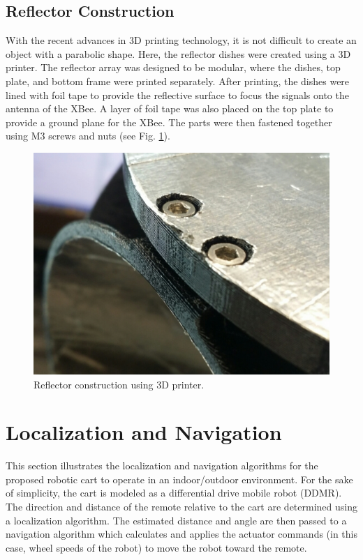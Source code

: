 \documentclass[conference]{IEEEtran}
\begin{document}
\subsection{Reflector Construction}
With the recent advances in 3D printing technology, it is not difficult to
create an object with a parabolic shape. Here, the reflector dishes
were created using a 3D printer. The reflector array was designed to be modular,
where the dishes, top plate, and bottom frame were printed separately. After
printing, the dishes were lined with foil tape to provide the reflective surface
to focus the signals onto the antenna of the XBee. A layer of foil tape was also
placed on the top plate to provide a ground plane for the XBee. The parts were
then fastened together using M3 screws and nuts (see Fig.
\ref{fig:reflectorConstruction}).
%
\begin{figure}[htbp]
    \centering
    \includegraphics[scale=0.1]{figs/img/reflectorConstruction.jpg}
    \caption{Reflector construction using 3D printer.}
    \label{fig:reflectorConstruction}
\end{figure}
%


\section{Localization and Navigation}
\label{sec:locAndNavAlgos}

This section illustrates the localization and navigation algorithms for the
proposed robotic cart to operate in an indoor/outdoor environment. For the sake
of simplicity, the cart is modeled as a differential drive mobile robot (DDMR).
The direction and distance of the remote relative to the cart are determined
using a localization algorithm. The estimated distance and angle are then passed
to a navigation algorithm which calculates and applies the actuator commands
(in this case, wheel speeds of the robot) to move the robot toward the remote.
\end{document}
